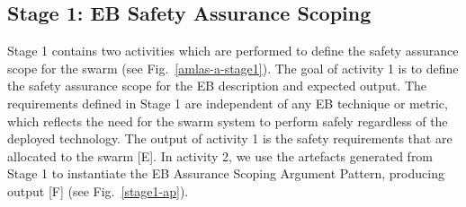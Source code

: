 \documentclass[runningheads]{llncs}
\begin{document}
\subsection{Stage 1: EB Safety Assurance Scoping} \label{framework-stage1}
Stage 1 contains two activities which are performed to define the safety assurance scope for the swarm (see Fig.~\ref{amlas-a-stage1}). 
The goal of activity 1 is to define the safety assurance scope for the EB description and expected output. 
The requirements defined in Stage 1 are independent of any EB technique or metric, which reflects the need for the swarm system to perform safely regardless of the deployed technology.
The output of activity 1 is the safety requirements that are allocated to the swarm [E].
In activity 2, we use the artefacts generated from Stage 1 to instantiate the EB Assurance Scoping Argument Pattern, producing output [F] (see Fig.~\ref{stage1-ap}). 
\end{document}
